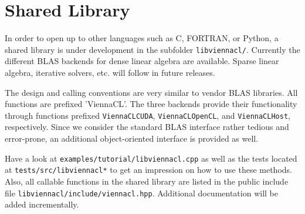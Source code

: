 \chapter{Shared Library} \label{chap:shared-lib}
In order to open up {\ViennaCL} to other languages such as C, FORTRAN, or Python,
a shared library is under development in the subfolder \lstinline|libviennacl/|.
Currently the different BLAS backends for dense linear algebra are available.
Sparse linear algebra, iterative solvers, etc. will follow in future releases.

The design and calling conventions are very similar to vendor BLAS libraries.
All functions are prefixed 'ViennaCL'. The three backends provide their functionality
through functions prefixed \lstinline|ViennaCLCUDA|, \lstinline|ViennaCLOpenCL|, and \lstinline|ViennaCLHost|, respectively.
Since we consider the standard BLAS interface rather tedious and error-prone, an additional object-oriented interface is provided as well.

Have a look at \lstinline|examples/tutorial/libviennacl.cpp| as well as the tests located at \lstinline|tests/src/libviennacl*| to get an impression on how to use these methods.
Also, all callable functions in the shared library are listed in the public include file \lstinline|libviennacl/include/viennacl.hpp|.
Additional documentation will be added incrementally.